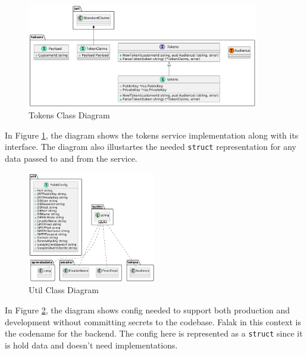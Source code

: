 \newpage
    
\begin{figure}[!h]
    \centering
    \includegraphics[width=0.9\textwidth]{images/docs/diagrams/class/class-diagram/tokens.png}
    \caption{Tokens Class Diagram}
    \label{fig:tokens-class-diagram}
\end{figure}

In Figure \ref{fig:tokens-class-diagram}, the diagram shows the tokens service implementation along with its interface. The diagram also illustartes the needed \texttt{struct} representation for any data passed to and from the service.

\newpage
    
\begin{figure}[!h]
    \centering
    \includegraphics[width=0.5\textwidth]{images/docs/diagrams/class/class-diagram/util.png}
    \caption{Util Class Diagram}
    \label{fig:util-class-diagram}
\end{figure}

In Figure \ref{fig:util-class-diagram}, the diagram shows config needed to support both production and development without committing secrets to the codebase. Falak in this context is the codename for the backend. The config here is represented as a \texttt{struct} since it is hold data and doesn't need implementations.